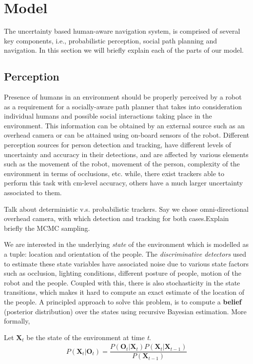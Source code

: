 \section{Model}
\label{sec:model}
The uncertainty based human-aware navigation system, is comprised of several key components, i.e., probabilistic perception, social path planning and navigation. In this section we will briefly explain each of the parts of our model.

\subsection{Perception}

Presence of humans in an environment should be properly perceived by a robot as a requirement for a socially-aware path planner that takes into consideration individual humans and possible social interactions taking place in the environment. This information can be obtained by an external source such as an overhead camera or can be attained using on-board sensors of the robot. Different perception sources for person detection and tracking, have different levels of uncertainty and accuracy in their detections, and are affected by various elements such as the movement of the robot, movement of the person, complexity of the environment in terms of occlusions, etc. while, there exist trackers able to perform this task with cm-level accuracy, others have a much larger uncertainty associated to them. 

Talk about deterministic v.s. probabilistic trackers. 
Say we chose omni-directional overhead camera, with which detection and tracking for both cases.Explain briefly the MCMC sampling.

We are interested in the underlying \textit{state} of the environment which is modelled as a tuple: location and orientation of the people. The \textit{discriminative detectors} used to estimate these state variables have associated noise due to various state factors such as occlusion, lighting conditions, different posture of people, motion of the robot and the people. Coupled with this, there is also stochasticity in the state transitions, which makes it hard to compute an exact estimate of the location of the people. A principled approach to solve this problem, is to compute a \textbf{belief} (posterior distribution) over the states using recursive Bayesian estimation. More formally,

Let $\textbf{X}_{t}$ be the state of the environment at time \textit{t}.
\begin{align}
P(\textbf{X}_{t} | \textbf{O}_{t}) = \dfrac{P(\textbf{O}_{t} | \textbf{X}_{t}) P(\textbf{X}_{t}|\textbf{X}_{t-1})} {P(\textbf{X}_{t-1})}
\end{align} 

